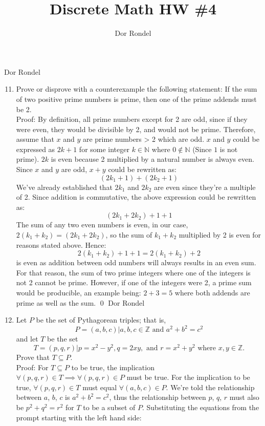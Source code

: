 \documentclass{article}
\title{Discrete Math HW \#4}
\author{Dor Rondel}
\begin{document}
\maketitle
\newpage
Dor Rondel \\
\begin{enumerate}
  \setcounter{enumi}{10}
  \item Prove or disprove with a counterexample the following statement:
If the sum of two positive prime numbers is prime, then one of the prime
addends must be 2. \\
  \newline
  Proof: By definition, all prime numbers except for 2 are odd, since if they were even, they would be divisible by 2, and would not be prime. Therefore, assume that $x$ and $y$ are prime numbers > 2 which are odd. $x$ and $y$ could be expressed as $2k+1$ for some integer $k \in \mathbb{N}$ where $0 \notin \mathbb{N}$ (Since $1$ is not prime). $2k$ is even because 2 multiplied by a natural number is always even. Since $x$ and $y$ are odd, $x+y$ could be rewritten as: $$(2k_1+1) + (2k_2+1)$$ We've already established that $2k_1$ and $2k_2$ are even since they're a multiple of 2. Since addition is commutative, the above expression could be rewritten as: $$(2k_1 + 2k_2) + 1 + 1$$ The sum of any two even numbers is even, in our case, $2(k_1 + k_2) = (2k_1 + 2k_2)$, so the sum of $k_1 + k_2$ multiplied by 2 is even for reasons stated above. Hence: $$2(k_1 + k_2) + 1 + 1 = 2(k_1 + k_2) + 2$$ is even as addition between odd numbers will always results in an even sum. For that reason, the sum of two prime integers where one of the integers is not 2 cannot be prime. However, if one of the integers were 2, a prime sum would be producible, an example being: $2+3=5$ where both addends are prime as well as the sum. \qed
\newpage
Dor Rondel \\
  \item Let $P$ be the set of Pythagorean triples; that is,
$$ P=(a,b,c) | a,b,c \in \mathbb{Z} \textrm{ and } a^2+b^2=c^2$$
and let $T$ be the set
$$ T =(p, q, r) | p=x^2-y^2, q=2xy, \textrm{ and } r=x^2+y^2 \textrm{ where } x, y \in \mathbb{Z}.$$
Prove that $T \subseteq P$. \\
\newline
Proof: For $T \subseteq P$ to be true, the implication $\forall (p, q, r) \in T \implies \forall (p, q, r) \in P$ must be true. For the implication to be true, $\forall (p, q, r) \in T$ must equal $\forall (a, b, c) \in P$. We're told the relationship between $a$, $b$, $c$ is $a^2+b^2=c^2$, thus the relationship between $p$, $q$, $r$ must also be $p^2+q^2=r^2$ for $T$ to be a subset of $P$. Substituting the equations from the prompt starting with the left hand side: \\

\end{enumerate}
\end{document}
